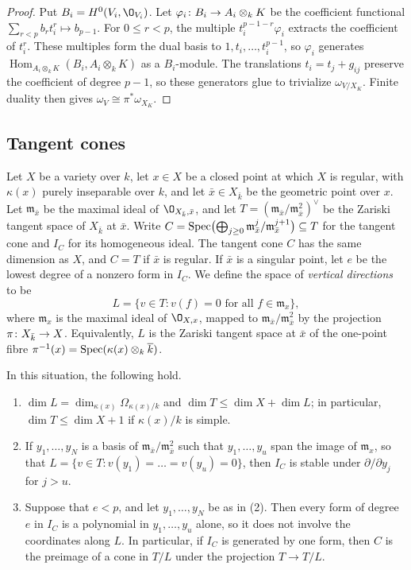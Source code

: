 \begin{proof}
Put $B_i = H^0(V_i,\O_{V_i})$.
Let $\varphi_i\colon B_i\to A_i\otimes_kK$ be the coefficient functional $\sum_{r<p}b_rt_i^r\mapsto b_{p-1}$.
For $0\leq r<p$, the multiple $t_i^{p-1-r}\varphi_i$ extracts the coefficient of $t_i^r$.
These multiples form the dual basis to $1,t_i,\ldots,t_i^{p-1}$, so $\varphi_i$ generates $\operatorname{Hom}_{A_i\otimes_kK}(B_i,A_i\otimes_kK)$ as a $B_i$-module.
The translations $t_i = t_j+g_{ij}$ preserve the coefficient of degree $p-1$, so these generators glue to trivialize $\omega_{V/X_K}$.
Finite duality then gives $\omega_V\cong\pi^*\omega_{X_K}$.
\end{proof}

\subsection{Tangent cones}\label{subsec:tangent-cones}
Let $X$ be a variety over $k$, let $x\in X$ be a closed point at which $X$ is regular, with $\kappa(x)$ purely inseparable over $k$, and let $\bar x\in X_{\bar k}$ be the geometric point over $x$.
Let $\mathfrak m_{\bar x}$ be the maximal ideal of $\O_{X_{\bar k},\bar x}$, and let $T = (\mathfrak m_{\bar x}/\mathfrak m_{\bar x}^2)^\vee$ be the Zariski tangent space of $X_{\bar k}$ at $\bar x$.
Write $C = \operatorname{Spec}\bigl(\bigoplus_{j\geq 0}\mathfrak m_{\bar x}^j/\mathfrak m_{\bar x}^{j+1}\bigr)\subseteq T$ for the tangent cone and $I_C$ for its homogeneous ideal.
The tangent cone $C$ has the same dimension as $X$, and $C = T$ if $\bar x$ is regular.
If $\bar x$ is a singular point, let $e$ be the lowest degree of a nonzero form in $I_C$.
We define the space of \emph{vertical directions} to be
\[
  L = \{v\in T : v(f) = 0\text{ for all }f\in\mathfrak m_x\},
\]
where $\mathfrak m_x$ is the maximal ideal of $\O_{X,x}$, mapped to $\mathfrak m_{\bar x}/\mathfrak m_{\bar x}^2$ by the projection $\pi\colon X_{\bar k}\to X$.
Equivalently, $L$ is the Zariski tangent space at $\bar x$ of the one-point fibre $\pi^{-1}(x) = \operatorname{Spec}(\kappa(x)\otimes_k\overline k)$.

\begin{lemma}\label{lem:tangent-cone}
In this situation, the following hold.
\begin{enumerate}[label=\textup{(\arabic*)}]
\item $\dim L = \dim_{\kappa(x)}\Omega_{\kappa(x)/k}$ and $\dim T\leq\dim X+\dim L$; in particular, $\dim T\leq\dim X+1$ if $\kappa(x)/k$ is simple.
\item If $y_1,\dots,y_N$ is a basis of $\mathfrak m_{\bar x}/\mathfrak m_{\bar x}^2$ such that $y_1,\dots,y_u$ span the image of $\mathfrak m_x$, so that $L = \{v\in T : v(y_1) = \dots = v(y_u) = 0\}$, then $I_C$ is stable under $\partial/\partial y_j$ for $j>u$.
\item Suppose that $e<p$, and let $y_1,\dots,y_N$ be as in \textup{(2)}.
  Then every form of degree $e$ in $I_C$ is a polynomial in $y_1,\dots,y_u$ alone, so it does not involve the coordinates along $L$.
  In particular, if $I_C$ is generated by one form, then $C$ is the preimage of a cone in $T/L$ under the projection $T\to T/L$.
\end{enumerate}
\end{lemma}

